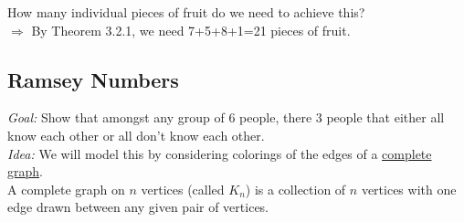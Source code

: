 \documentclass[12pt]{article}
\begin{document}
How many individual pieces of fruit do we need to achieve this?\\

$\Rightarrow$ By Theorem 3.2.1, we need 7+5+8+1=21 pieces of fruit.

\newpage
\subsection{Ramsey Numbers}
{\sl Goal: } Show that amongst any group of 6 people, there 3 people that either all know each other or all don't know each other. \\

{\sl Idea: } We will model this by considering colorings of the edges of a \underline{complete graph}.\\

A complete graph on $n$ vertices (called $K_n$) is a collection of $n$ vertices with one edge drawn between any given pair of vertices.
\end{document}
